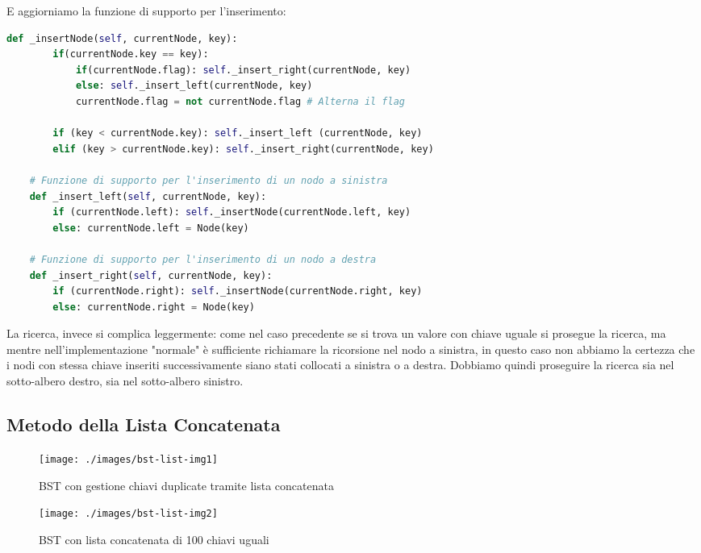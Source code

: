 \documentclass{article}
\begin{document}
E aggiorniamo la funzione di supporto per l'inserimento:

\begin{lstlisting}[language=Python]
    def _insertNode(self, currentNode, key):        
        if(currentNode.key == key):
            if(currentNode.flag): self._insert_right(currentNode, key)
            else: self._insert_left(currentNode, key)
            currentNode.flag = not currentNode.flag # Alterna il flag
    
        if (key < currentNode.key): self._insert_left (currentNode, key)
        elif (key > currentNode.key): self._insert_right(currentNode, key)

    # Funzione di supporto per l'inserimento di un nodo a sinistra
    def _insert_left(self, currentNode, key):
        if (currentNode.left): self._insertNode(currentNode.left, key)
        else: currentNode.left = Node(key)

    # Funzione di supporto per l'inserimento di un nodo a destra
    def _insert_right(self, currentNode, key):
        if (currentNode.right): self._insertNode(currentNode.right, key)
        else: currentNode.right = Node(key)
\end{lstlisting}



La ricerca, invece si complica leggermente: come nel caso precedente se si trova un valore con chiave uguale si prosegue la ricerca, ma mentre nell'implementazione "normale" è sufficiente richiamare la ricorsione nel nodo a sinistra, in questo caso non abbiamo la certezza che i nodi con stessa chiave inseriti successivamente siano stati collocati a sinistra o a destra. Dobbiamo quindi proseguire la ricerca sia nel sotto-albero destro, sia nel sotto-albero sinistro.


\subsection{Metodo della Lista Concatenata}
\label{subsec:list-implementation}

\begin{figure}[htbp]
  \begin{minipage}{0.48\textwidth}  %
    \centering
    \texttt{[image: ./images/bst-list-img1]}
    \caption{BST con gestione chiavi duplicate tramite lista concatenata}
    \label{fig:bst-list-img1}
  \end{minipage}%
  \hfill  %
  \begin{minipage}{0.48\textwidth}  %
    \centering
    \texttt{[image: ./images/bst-list-img2]}
    \caption{BST con lista concatenata di 100 chiavi uguali}
    \label{fig:bst-list-img2}
  \end{minipage}
\end{figure}
\end{document}
